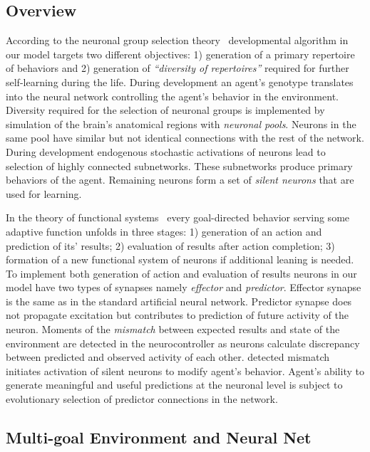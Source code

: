 \documentclass[letterpaper]{article}
\begin{document}
\subsection{Overview}

According to the neuronal group selection theory~\citep{Edelman1993} developmental algorithm in our model targets two different objectives: 1) generation of a primary repertoire of behaviors and 2) generation of {\em ``diversity of repertoires''} required for further self-learning during the life. During development an agent's genotype translates into the neural network controlling the agent's behavior in the environment. Diversity required for the selection of neuronal groups is implemented by simulation of the brain's anatomical regions with \textit{neuronal pools}. Neurons in the same pool have similar but not identical connections with the rest of the network. During development endogenous stochastic activations of neurons lead to selection of highly connected subnetworks. These subnetworks produce primary behaviors of the agent. Remaining neurons form a set of {\em silent neurons} that are used for learning.     

In the theory of functional systems~\citep{Anokhin1974} every goal-directed behavior serving some adaptive function unfolds in three stages: 1) generation of an action and prediction of its' results; 2) evaluation of results after action completion; 3) formation of a new functional system of neurons if additional leaning is needed. To implement both generation of action and evaluation of results neurons in our model have two types of synapses namely \textit{effector} and {\em predictor}. Effector synapse is the same as in the standard artificial neural network. Predictor synapse does not propagate excitation but contributes to prediction of future activity of the neuron. Moments of the {\em mismatch} between expected results and state of the environment are detected in the neurocontroller as neurons calculate discrepancy between predicted and observed activity of each other. detected mismatch initiates activation of silent neurons to modify agent's behavior. Agent's ability to generate meaningful and useful predictions at the neuronal level is subject to evolutionary selection of predictor connections in the network.

\subsection{Multi-goal Environment and Neural Net}
\end{document}
